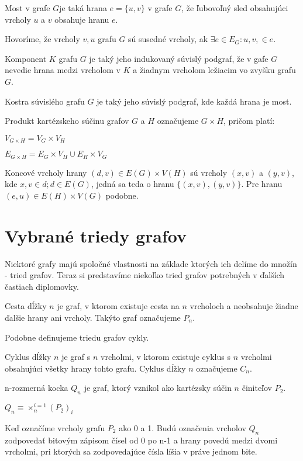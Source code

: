 \begin{defin}
Most v grafe $G$je taká hrana $e = \{ u,v \}$ v grafe $G$, že ľubovoľný sled 
obsahujúci vrcholy $u$ a $v$ obsahuje hranu $e$.
\end{defin}

\begin{defin}
Hovoríme, že vrcholy $v, u$ grafu $G$ sú susedné vrcholy, ak $\exists e \in
E_{G}: u,v, \in e$.
\end{defin}

\begin{defin}
Komponent $K$ grafu $G$ je taký jeho indukovaný súvislý podgraf, že v gafe 
$G$ nevedie hrana medzi vrcholom v $K$ a žiadnym vrcholom ležiacim vo 
zvyšku grafu $G$.
\end{defin}

\begin{defin}
Kostra súvislého grafu $G$ je taký jeho súvislý podgraf, kde každá hrana je
most.
\end{defin}

\begin{defin}
Produkt kartézskeho súčinu grafov $G$ a $H$ označujeme $G \times H$, pričom
platí:

$V_{G \times H} = V_{G} \times V_{H}$

$E_{G \times H} = E_{G} \times V_{H} \cup E_{H} \times V_{G} $

Koncové vrcholy hrany $(d,v) \in E(G) \times V(H)$ sú vrcholy $(x,v)$ a
$(y,v)$, kde $x,v \in d; d \in E(G)$, jedná sa teda o hranu $\{(x,v), (y,v)\}$.
Pre hranu $(e,u) \in E(H) \times V(G)$
podobne.
\end{defin}


\section{Vybrané triedy grafov}
Niektoré grafy majú spoločné vlastnosti na základe ktorých ich delíme do
množín - tried grafov.
Teraz si predstavíme niekoľko tried grafov potrebných v ďalších častiach
diplomovky. 

\begin{defin}
Cesta dĺžky $n$ je graf, v ktorom existuje cesta na $n$ vrcholoch a neobsahuje
žiadne ďalšie hrany ani vrcholy. Takýto graf označujeme $P_{n}$.
\end{defin}

Podobne definujeme triedu grafov cykly.

\begin{defin}
Cyklus dĺžky $n$ je graf s $n$ vrcholmi, v ktorom existuje cyklus s $n$
vrcholmi obsahujúci všetky hrany tohto grafu. Cyklus dĺžky $n$ označujeme
$C_{n}$.
\end{defin}

\begin{defin}
n-rozmerná kocka $Q_{n}$ je graf, ktorý vznikol ako kartézsky súčin $n$
činiteľov $P_{2}$.

$Q_{n} \equiv \times_{n}^{i=1} (P_{2})_{i}$

Keď označíme vrcholy grafu $P_{2}$ ako 0 a 1. Budú označenia vrcholov $Q_{n}$
zodpovedať bitovým zápisom čísel od 0 po n-1 a hrany povedú medzi dvomi
vrcholmi, pri ktorých sa zodpovedajúce čísla líšia v práve jednom bite.
\end{defin}